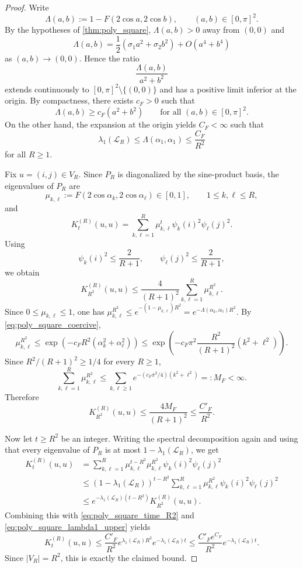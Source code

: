 \documentclass[reqno]{amsart}
\numberwithin{equation}{section}
\theoremstyle{definition}
\theoremstyle{remark}
\newcommand{\Cref}[1]{\autoref{#1}}
\begin{document}
\begin{proof}
Write
\[
  \Lambda(a,b):=1-F(2\cos a,2\cos b),
  \qquad (a,b)\in[0,\pi]^2.
\]
By the hypotheses of \Cref{thm:poly_square}, $\Lambda(a,b)>0$ away from $(0,0)$ and
\[
  \Lambda(a,b)=\frac12(\sigma_1 a^2+\sigma_2 b^2)+O(a^4+b^4)
\]
as $(a,b)\to(0,0)$. Hence the ratio
\[
  \frac{\Lambda(a,b)}{a^2+b^2}
\]
extends continuously to $[0,\pi]^2\setminus\{(0,0)\}$ and has a positive limit inferior at the origin. By compactness, there exists $c_F>0$ such that
\begin{equation}\label{eq:poly_square_coercive}
  \Lambda(a,b)\ge c_F(a^2+b^2)
  \qquad\text{for all }(a,b)\in[0,\pi]^2.
\end{equation}
On the other hand, the expansion at the origin yields $C_F<\infty$ such that
\begin{equation}\label{eq:poly_square_lambda1_upper}
  \lambda_1(\mathcal L_R)\le \Lambda(\alpha_1,\alpha_1)\le \frac{C_F}{R^2}
\end{equation}
for all $R\ge1$.

Fix $u=(i,j)\in V_R$. Since $P_R$ is diagonalized by the sine-product basis, the eigenvalues of $P_R$ are
\[
  \mu_{k,\ell}:=F(2\cos\alpha_k,2\cos\alpha_\ell)\in[0,1],
  \qquad
  1\le k,\ell\le R,
\]
and
\[
  K_t^{(R)}(u,u)
  =
  \sum_{k,\ell=1}^R \mu_{k,\ell}^t \psi_k(i)^2\psi_\ell(j)^2.
\]
Using
\[
  \psi_k(i)^2\le \frac{2}{R+1},
  \qquad
  \psi_\ell(j)^2\le \frac{2}{R+1},
\]
we obtain
\[
  K_{R^2}^{(R)}(u,u)
  \le
  \frac{4}{(R+1)^2}
  \sum_{k,\ell=1}^R \mu_{k,\ell}^{R^2}.
\]
Since $0\le \mu_{k,\ell}\le1$, one has $\mu_{k,\ell}^{R^2}\le e^{-(1-\mu_{k,\ell})R^2}=e^{-\Lambda(\alpha_k,\alpha_\ell)R^2}$. By \eqref{eq:poly_square_coercive},
\[
  \mu_{k,\ell}^{R^2}
  \le
  \exp\!\left(
    -c_F R^2(\alpha_k^2+\alpha_\ell^2)
  \right)
  \le
  \exp\!\left(
    -c_F\pi^2\frac{R^2}{(R+1)^2}(k^2+\ell^2)
  \right).
\]
Since $R^2/(R+1)^2\ge 1/4$ for every $R\ge1$,
\[
  \sum_{k,\ell=1}^R \mu_{k,\ell}^{R^2}
  \le
  \sum_{k,\ell\ge1} e^{-(c_F\pi^2/4)(k^2+\ell^2)}
  =:M_F<\infty.
\]
Therefore
\begin{equation}\label{eq:poly_square_time_R2}
  K_{R^2}^{(R)}(u,u)\le \frac{4M_F}{(R+1)^2}\le \frac{C'_F}{R^2}.
\end{equation}

Now let $t\ge R^2$ be an integer. Writing the spectral decomposition again and using that every eigenvalue of $P_R$ is at most $1-\lambda_1(\mathcal L_R)$, we get
\begin{align*}
  K_t^{(R)}(u,u)
  &= \sum_{k,\ell=1}^R \mu_{k,\ell}^{t-R^2}\mu_{k,\ell}^{R^2}\psi_k(i)^2\psi_\ell(j)^2 \\
  &\le (1-\lambda_1(\mathcal L_R))^{t-R^2}
      \sum_{k,\ell=1}^R \mu_{k,\ell}^{R^2}\psi_k(i)^2\psi_\ell(j)^2 \\
  &\le e^{-\lambda_1(\mathcal L_R)(t-R^2)}K_{R^2}^{(R)}(u,u).
\end{align*}
Combining this with \eqref{eq:poly_square_time_R2} and \eqref{eq:poly_square_lambda1_upper} yields
\[
  K_t^{(R)}(u,u)
  \le
  \frac{C'_F}{R^2}
  e^{\lambda_1(\mathcal L_R)R^2}
  e^{-\lambda_1(\mathcal L_R)t}
  \le
  \frac{C'_F e^{C_F}}{R^2}e^{-\lambda_1(\mathcal L_R)t}.
\]
Since $|V_R|=R^2$, this is exactly the claimed bound.
\end{proof}
\end{document}
